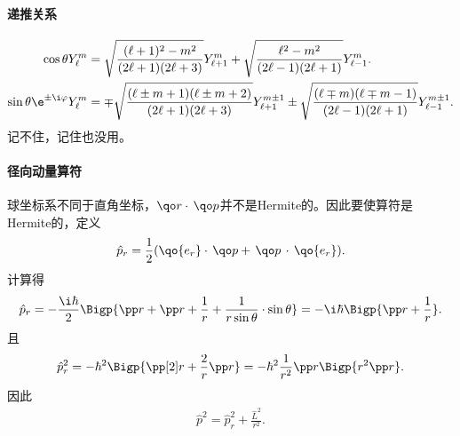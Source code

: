 \paragraph{递推关系}
\begin{align}\label{costhetaYlm}
	\cos\theta Y_\ell^m&=\sqrt{\frac{(\ell+1)^2-m^2}{(2\ell+1)(2\ell+3)}}Y_{\ell+1}^m+\sqrt{\frac{\ell^2-m^2}{(2\ell-1)(2\ell+1)}}Y_{\ell-1}^m.\\
	\sin\theta\e^{\pm\i\varphi}Y_\ell^m&=\mp\sqrt{\frac{(\ell\pm m+1)(\ell\pm m+2)}{(2\ell+1)(2\ell+3)}}Y_{\ell+1}^{m\pm 1}\pm\sqrt{\frac{(\ell\mp m)(\ell\mp m-1)}{(2\ell-1)(2\ell+1)}}Y_{\ell-1}^{m\pm 1}.
\end{align}
记不住，记住也没用。
\paragraph{径向动量算符}球坐标系不同于直角坐标，$\qo r\cdot\,\qo p$并不是Hermite的。因此要使算符是Hermite的，定义
\[
	\hat p_r=\frac12(\qo{e_r}\cdot\,\qo p+\,\qo p\,\cdot\,\qo{e_r}).
\]
计算得
\begin{align}
	\hat p_r=-\frac{\i\hbar}2\Bigp{\pp r+\pp r+\frac1r+\frac1{r\sin\theta}\cdot\sin\theta}=-\i\hbar\Bigp{\pp r+\frac1r}.
\end{align}
且
\[
	\hat p_r^2=-\hbar^2\Bigp{\pp[2]r+\frac2r\pp r}=-\hbar^2\frac1{r^2}\pp r\Bigp{r^2\pp r}.
\]
因此
\begin{align}
	\hat p^2=\hat p_r^2+\frac{\hat L^2}{r^2}.
\end{align}